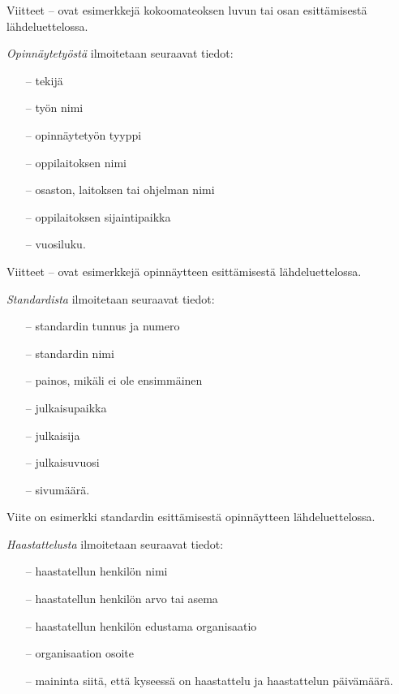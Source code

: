 \documentclass[english, 12pt, a4paper, elec, utf8, a-1b, online]{aaltothesis}
\begin{document}
Viitteet \cite{Sihvola}--\cite{Lindblom} ovat esimerkkej\"a
kokoomateoksen luvun tai osan esitt\"amisest\"a l\"ahdeluettelossa. 

\textit{Opinn\"aytety\"ost\"a} ilmoitetaan seuraavat tiedot:

\begin{itemize}
\item[--]tekij\"a
\item[--]ty\"on nimi
\item[--]opinn\"aytety\"on tyyppi
\item[--]oppilaitoksen nimi
\item[--]osaston, laitoksen tai ohjelman nimi
\item[--]oppilaitoksen sijaintipaikka
\item[--]vuosiluku.
\end{itemize}

Viitteet \cite{Miinusmaa}--\cite{Lonnqvist} ovat esimerkkej\"a
opinn\"aytteen esitt\"amisest\"a l\"ahdeluettelossa. 

\textit{Standardista} ilmoitetaan seuraavat tiedot:

\begin{itemize}
\item[--]standardin tunnus ja numero
\item[--]standardin nimi
\item[--]painos, mik\"ali ei ole ensimm\"ainen
\item[--]julkaisupaikka
\item[--]julkaisija
\item[--]julkaisuvuosi
\item[--]sivum\"a\"ar\"a.
\end{itemize}
Viite \cite{sfs} on esimerkki standardin esitt\"amisest\"a opinn\"aytteen
l\"ahdeluettelossa. 

\textit{Haastattelusta} ilmoitetaan seuraavat tiedot:

\begin{itemize}
\item[--]haastatellun henkil\"on nimi
\item[--]haastatellun henkil\"on arvo tai asema
\item[--]haastatellun henkil\"on edustama organisaatio
\item[--]organisaation osoite
\item[--]maininta siit\"a, ett\"a kyseess\"a on haastattelu ja haastattelun
p\"aiv\"am\"a\"ar\"a. 
\end{itemize}
\end{document}
